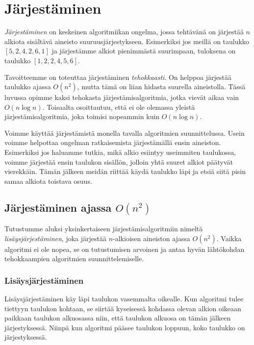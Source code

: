 \chapter{Järjestäminen}

\emph{Järjestäminen} on keskeinen algoritmiikan ongelma,
jossa tehtävänä on jär\-jestää $n$ alkiota sisältävä
aineisto suuruusjärjestykseen.
Esimerkiksi jos meillä on taulukko $[5,2,4,2,6,1]$ ja
järjestämme alkiot pienimmästä suurimpaan,
tuloksena on taulukko $[1,2,2,4,5,6]$.

Tavoitteemme on toteuttaa järjestäminen
\emph{tehokkaasti}.
On helppoa järjes\-tää taulukko ajassa $O(n^2)$,
mutta tämä on liian hidasta suurella aineistolla.
Tässä luvussa opimme kaksi tehokasta
järjestämisalgoritmia, jotka vievät aikaa vain $O(n \log n)$.
Toisaalta osoittautuu, että ei ole olemassa
yleistä järjestämisalgoritmia, joka toimisi nopeammin
kuin $O(n \log n)$.

Voimme käyttää järjestämistä monella tavalla
algoritmien suunnittelussa.
Usein voimme helpottaa ongelman ratkaisemista
järjestämällä ensin aineiston.
Esimerkiksi jos haluamme tutkia,
mikä alkio esiintyy useimmiten taulukossa,
voimme järjestää ensin taulukon sisällön,
jolloin yhtä suuret alkiot päätyvät vierekkäin.
Tämän jälkeen meidän riittää käydä taulukko läpi
ja etsiä siitä pisin samaa alkiota toistava osuus.

\section{Järjestäminen ajassa $O(n^2)$}

Tutustumme aluksi yksinkertaiseen järjestämisalgoritmiin
nimeltä \emph{lisäysjär\-jestäminen},
joka järjestää $n$-alkioisen aineiston ajassa $O(n^2)$.
Vaikka algoritmi ei ole nopea, se on tutustumisen arvoinen
ja antaa hyvän lähtökohdan tehokkaampien algoritmien
suunnittelemiselle.

\subsection{Lisäysjärjestäminen}

Lisäysjärjestäminen käy läpi taulukon
vasemmalta oikealle.
Kun algoritmi tulee tiettyyn taulukon kohtaan,
se siirtää kyseisessä kohdassa olevan alkion
oikeaan paikkaan taulukon
alkuosassa niin, että taulukon alkuosa
on tämän jälkeen järjestyksessä.
Niinpä kun algoritmi pääsee taulukon loppuun,
koko taulukko on järjestyksessä.

